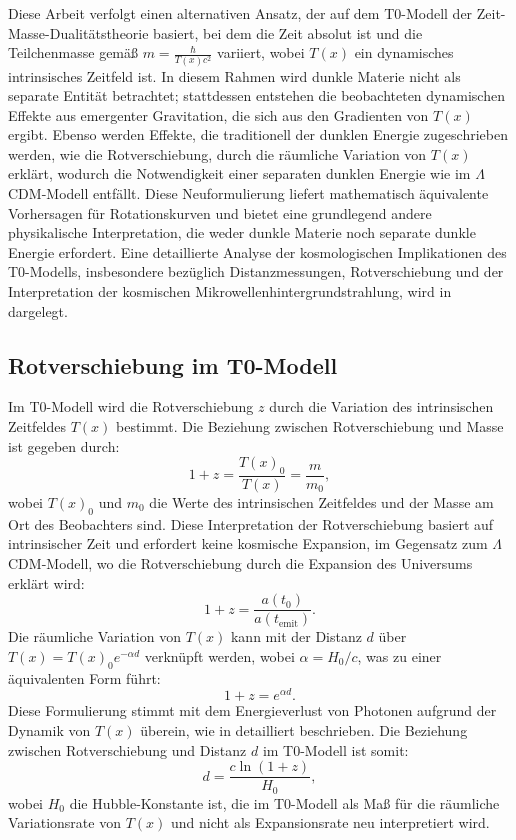 \documentclass[12pt,a4paper]{article}
\newcommand{\Tfield}{T(x)}
\begin{document}
	Diese Arbeit verfolgt einen alternativen Ansatz, der auf dem T0-Modell der Zeit-Masse-Dualitätstheorie basiert, bei dem die Zeit absolut ist und die Teilchenmasse gemäß \( m = \frac{\hbar}{\Tfield c^2} \) variiert, wobei \( \Tfield \) ein dynamisches intrinsisches Zeitfeld ist. In diesem Rahmen wird dunkle Materie nicht als separate Entität betrachtet; stattdessen entstehen die beobachteten dynamischen Effekte aus emergenter Gravitation, die sich aus den Gradienten von \( \Tfield \) ergibt. Ebenso werden Effekte, die traditionell der dunklen Energie zugeschrieben werden, wie die Rotverschiebung, durch die räumliche Variation von \( \Tfield \) erklärt, wodurch die Notwendigkeit einer separaten dunklen Energie wie im \(\Lambda\)CDM-Modell entfällt. Diese Neuformulierung liefert mathematisch äquivalente Vorhersagen für Rotationskurven und bietet eine grundlegend andere physikalische Interpretation, die weder dunkle Materie noch separate dunkle Energie erfordert. Eine detaillierte Analyse der kosmologischen Implikationen des T0-Modells, insbesondere bezüglich Distanzmessungen, Rotverschiebung und der Interpretation der kosmischen Mikrowellenhintergrundstrahlung, wird in \cite{pascher_messdifferenzen_2025} dargelegt.
	
	\subsection{Rotverschiebung im T0-Modell}
	Im T0-Modell wird die Rotverschiebung \( z \) durch die Variation des intrinsischen Zeitfeldes \( \Tfield \) bestimmt. Die Beziehung zwischen Rotverschiebung und Masse ist gegeben durch:
	\begin{equation}
		1 + z = \frac{\Tfield_0}{\Tfield} = \frac{m}{m_0},
	\end{equation}
	wobei \( \Tfield_0 \) und \( m_0 \) die Werte des intrinsischen Zeitfeldes und der Masse am Ort des Beobachters sind. Diese Interpretation der Rotverschiebung basiert auf intrinsischer Zeit und erfordert keine kosmische Expansion, im Gegensatz zum \(\Lambda\)CDM-Modell, wo die Rotverschiebung durch die Expansion des Universums erklärt wird:
	\begin{equation}
		1 + z = \frac{a(t_0)}{a(t_{\text{emit}})}.
	\end{equation}
	Die räumliche Variation von \( \Tfield \) kann mit der Distanz \( d \) über \( \Tfield = \Tfield_0 e^{-\alpha d} \) verknüpft werden, wobei \( \alpha = H_0/c \), was zu einer äquivalenten Form führt:
	\begin{equation}
		1 + z = e^{\alpha d}.
	\end{equation}
	Diese Formulierung stimmt mit dem Energieverlust von Photonen aufgrund der Dynamik von \( \Tfield \) überein, wie in \cite{pascher_messdifferenzen_2025} detailliert beschrieben. Die Beziehung zwischen Rotverschiebung und Distanz \( d \) im T0-Modell ist somit:
	\begin{equation}
		d = \frac{c \ln(1 + z)}{H_0},
	\end{equation}
	wobei \( H_0 \) die Hubble-Konstante ist, die im T0-Modell als Maß für die räumliche Variationsrate von \( \Tfield \) und nicht als Expansionsrate neu interpretiert wird.
	
\end{document}
